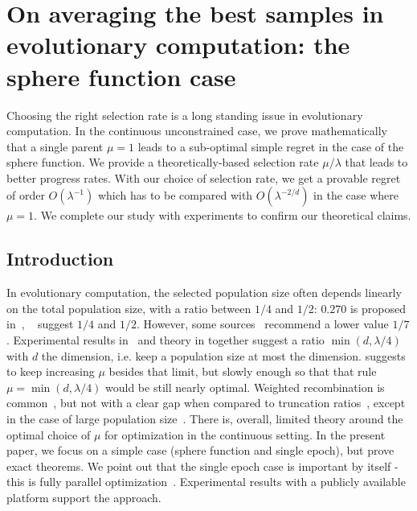 \chapter{On averaging the best samples in evolutionary computation: the sphere function case}
\label{paper:ppsn-kbest}
Choosing the right selection rate is a long standing issue in evolutionary computation. {In the continuous unconstrained case, }we prove mathematically that a single parent $\mu=1$ leads to a sub-optimal simple regret in the case of the sphere function. We provide a theoretically-based selection rate $\mu/\lambda$ that leads  to better progress rates. With our choice of selection rate, we get a provable regret of order $O(\lambda^{-1})$ which has to be compared with $O(\lambda^{-2/d})$ in the case where $\mu=1$. We complete our study with experiments to confirm our theoretical claims. %
\section{Introduction}
In evolutionary computation, the selected population size often depends linearly on the total population size, with a ratio between $1/4$ and $1/2$: $0.270$ is proposed in~\cite{escompr}, ~\cite{HAN,cmsa} suggest $1/4$ and $1/2$.
However,
some sources~\cite{amorales} recommend a lower value $1/7$. Experimental results in~\cite{ratio} and theory in \cite{fournierAlgorithmica} together suggest a ratio $\min(d,\lambda/4)$ with $d$ the dimension, i.e. keep a population size at most the dimension. \cite{jeb} suggests to keep increasing $\mu$ besides that limit, but slowly enough so that that rule $\mu=\min(d,\lambda/4)$ would be still nearly optimal. Weighted recombination is common~\cite{weightdirk}, but not with a clear gap when compared to truncation ratios~\cite{esniko}, except in the case of large population size~\cite{sumotori}.
There is, overall, limited theory around the optimal choice of $\mu$ for optimization in the continuous setting. 
In the present paper, we focus on a simple case (sphere function and single epoch), but prove exact theorems. 
We point out that the single epoch case is important {by} itself - this is fully parallel optimization~\cite{nie,mckay,bergstra2012random,bousquet}.
Experimental results with a publicly available platform support the approach.
